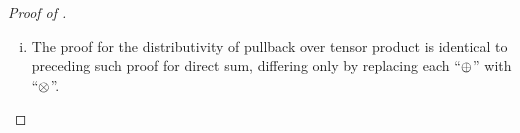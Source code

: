 \documentclass[../../sean_thesis.tex]{subfiles}
\begin{document}
\begin{proof}[Proof of ]
\begin{enumerate}[(i)]
		\item The proof for the distributivity of pullback over tensor product is identical to preceding such proof for direct sum, differing only by replacing each ``$\oplus$'' with ``$\otimes$''.
	\end{enumerate}
\end{proof}
\end{document}
